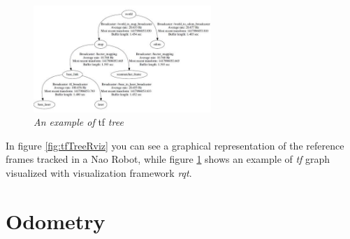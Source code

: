 \begin{figure}
	\centering
	\includegraphics[width=0.6\textwidth]{Images/background_and_tools/tfGraph.JPG}
	\caption{\textit{An example of} tf \textit{tree}}
	\label{fig:tfGraph}
\end{figure}

In figure \ref{fig:tfTreeRviz} you can see a graphical representation of the reference frames tracked in a Nao Robot, while figure \ref{fig:tfGraph} shows an example of \textit{tf} graph visualized with visualization framework \textit{rqt}. 


\section{Odometry}\label{sec:odometry}

